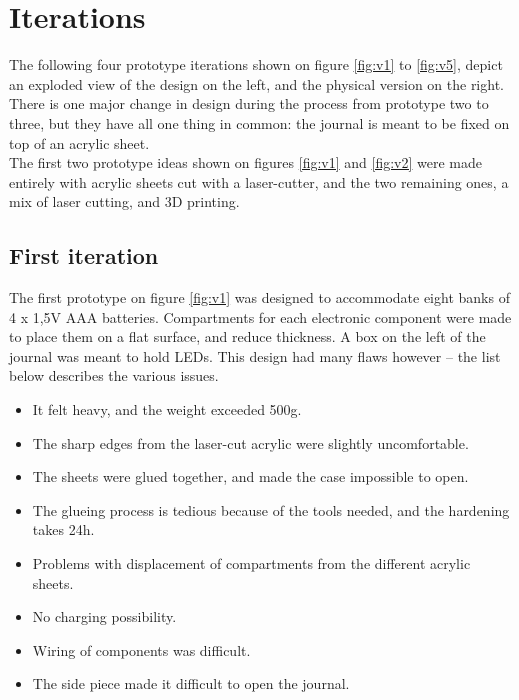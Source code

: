 \section{Iterations}

The following four prototype iterations shown on figure \ref{fig:v1} to \ref{fig:v5}, depict an exploded view of the design on the left, and the physical version on the right. There is one major change in design during the process from prototype two to three, but they have all one thing in common: the journal is meant to be fixed on top of an acrylic sheet. \\
The first two prototype ideas shown on figures \ref{fig:v1} and \ref{fig:v2} were made entirely with acrylic sheets cut with a laser-cutter, and the two remaining ones, a mix of laser cutting, and 3D printing.

\subsection{First iteration}
The first prototype on figure \ref{fig:v1} was designed to accommodate eight banks of 4 x 1,5V AAA batteries. Compartments for each electronic component were made to place them on a flat surface, and reduce thickness. A box on the left of the journal was meant to hold LEDs. This design had many flaws however -- the list below describes the various issues.

\begin{itemize} \itemsep0em
  \item It felt heavy, and the weight exceeded 500g.
  \item The sharp edges from the laser-cut acrylic were slightly uncomfortable.
  \item The sheets were glued together, and made the case impossible to open.
  \item The glueing process is tedious because of the tools needed, and the hardening takes 24h.
  \item Problems with displacement of compartments from the different acrylic sheets.
  \item No charging possibility.
  \item Wiring of components was difficult.
  \item The side piece made it difficult to open the journal.
\end{itemize}

